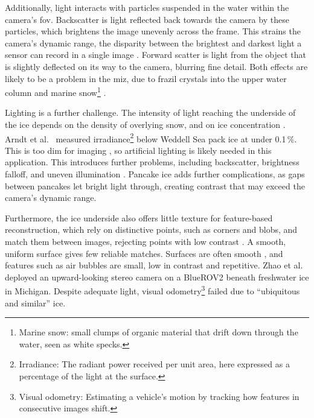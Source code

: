 Additionally, light interacts with particles suspended in the water within the camera's \gls{fov}.
Backscatter is light reflected back towards the camera by these particles, which brightens the image unevenly across
the frame. This strains the camera's dynamic range, the disparity between the brightest and darkest light a sensor can
record in a single image \cite{treibitzActivePolarizationDescattering2009}. Forward scatter is light from the object
that is slightly deflected on its way to the camera, blurring fine detail. Both effects are likely to be a problem in the \gls{miz}, due to frazil crystals into the upper water column
\cite{dobleWeddellPancake2003,shenConceptualModelPancakeice2001} and marine snow\footnote{Marine snow: small clumps of organic material that drift down through the water, seen as white specks.} \cite{alldredgeMarineSnow1988}.

Lighting is a further challenge. The intensity of light reaching the underside
of the ice depends on the density of overlying snow, and on ice
concentration \cite{horvatEvidencePhytoplanktonBlooms2022}.
Arndt et al.~\cite{arndtInfluenceSnowDepth2017} measured irradiance\footnote{Irradiance: The
radiant power received per unit area, here expressed as a
percentage of the light at the surface.} below Weddell Sea pack
ice at under 0.1\,\%. This is too dim for imaging \cite{katleinNewRemotelyOperated2017}, so artificial lighting
is likely needed in this application. This introduces further problems, including backscatter,
brightness falloff, and uneven illumination
\cite{jaffeComputerModelingDesign1990}. Pancake ice adds further
complications, as gaps between pancakes let bright light through,
creating contrast that may exceed the camera's dynamic range.

Furthermore, the ice underside also offers little texture for feature-based
reconstruction, which rely on  distinctive points, such as corners and blobs, and match them between images,
rejecting points with low contrast \cite{lowe2004}. A smooth, uniform surface gives few reliable matches.
Surfaces are often smooth
\cite{langeDevelopmentSeaIce1989}, and features such as air
bubbles are small, low in contrast and repetitive.
Zhao et al.~\cite{zhaoModifyingAffordableROV2021} deployed an upward-looking
stereo camera on a BlueROV2
beneath freshwater ice in Michigan. Despite adequate light,
visual odometry\footnote{Visual odometry: Estimating a vehicle's motion by tracking
how features in consecutive images shift.} failed due to
 ``ubiquitous and similar'' ice.



